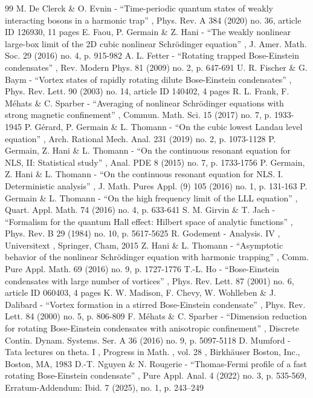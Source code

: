\documentclass[10pt]{amsart}
\theoremstyle{definition}
\begin{document}
\begin{thebibliography}{99}
 M. De Clerck \& O. Evnin - “Time-periodic quantum states of weakly interacting bosons in a harmonic trap” , Phys. Rev. A 384 (2020) no. 36, article ID 126930, 11 pages
 E. Faou, P. Germain \& Z. Hani - “The weakly nonlinear large-box limit of the 2D cubic nonlinear Schrödinger equation” , J. Amer. Math. Soc. 29 (2016) no. 4, p. 915-982
 A. L. Fetter - “Rotating trapped Bose-Einstein condensates” , Rev. Modern Phys. 81 (2009) no. 2, p. 647-691
 U. R. Fischer \& G. Baym - “Vortex states of rapidly rotating dilute Bose-Einstein condensates” , Phys. Rev. Lett. 90 (2003) no. 14, article ID 140402, 4 pages
 R. L. Frank, F. Méhats \& C. Sparber - “Averaging of nonlinear Schrödinger equations with strong magnetic confinement” , Commun. Math. Sci. 15 (2017) no. 7, p. 1933-1945
 P. Gérard, P. Germain \& L. Thomann - “On the cubic lowest Landau level equation” , Arch. Rational Mech. Anal. 231 (2019) no. 2, p. 1073-1128
 P. Germain, Z. Hani \& L. Thomann - “On the continuous resonant equation for NLS, II: Statistical study” , Anal. PDE 8 (2015) no. 7, p. 1733-1756
 P. Germain, Z. Hani \& L. Thomann - “On the continuous resonant equation for NLS. I. Deterministic analysis” , J. Math. Pures Appl. (9) 105 (2016) no. 1, p. 131-163
 P. Germain \& L. Thomann - “On the high frequency limit of the LLL equation” , Quart. Appl. Math. 74 (2016) no. 4, p. 633-641
 S. M. Girvin \& T. Jach - “Formalism for the quantum Hall effect: Hilbert space of analytic functions” , Phys. Rev. B 29 (1984) no. 10, p. 5617-5625
 R. Godement - Analysis. IV , Universitext , Springer, Cham, 2015
 Z. Hani \& L. Thomann - “Asymptotic behavior of the nonlinear Schrödinger equation with harmonic trapping” , Comm. Pure Appl. Math. 69 (2016) no. 9, p. 1727-1776
 T.-L. Ho - “Bose-Einstein condensates with large number of vortices” , Phys. Rev. Lett. 87 (2001) no. 6, article ID 060403, 4 pages
 K. W. Madison, F. Chevy, W. Wohlleben \& J. Dalibard - “Vortex formation in a stirred Bose-Einstein condensate” , Phys. Rev. Lett. 84 (2000) no. 5, p. 806-809
 F. Méhats \& C. Sparber - “Dimension reduction for rotating Bose-Einstein condensates with anisotropic confinement” , Discrete Contin. Dynam. Systems. Ser. A 36 (2016) no. 9, p. 5097-5118
 D. Mumford - Tata lectures on theta. I , Progress in Math. , vol. 28 , Birkhäuser Boston, Inc., Boston, MA, 1983
 D.-T. Nguyen \& N. Rougerie - “Thomas-Fermi profile of a fast rotating Bose-Einstein condensate” , Pure Appl. Anal. 4 (2022) no. 3, p. 535-569, Erratum-Addendum: Ibid. 7 (2025), no. 1, p. 243–249

\end{thebibliography}
\end{document}
